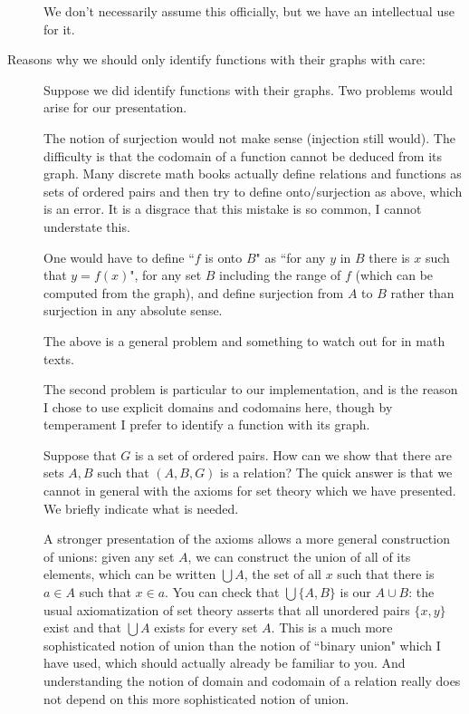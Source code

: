 \documentclass[12pt]{article}
\begin{document}
\begin{description}
\begin{description}
\end{description}

We don't necessarily assume this officially, but we have an intellectual use for it.

\item[Reasons why we should only identify functions with their graphs with care:]

Suppose we did identify functions with their graphs.  Two problems would arise for our presentation.

The notion of surjection would not make sense (injection still would).  The difficulty is that
the codomain of a function cannot be deduced from its graph.  Many discrete math books actually
define relations and functions as sets of ordered pairs and then try to define onto/surjection as above, which is an error.  It is a disgrace that this mistake is so common, I cannot understate this.

One would have to define ``$f$ is onto $B$" as ``for any $y$ in $B$ there is $x$ such that $y=f(x)$", for any set
$B$ including the range of $f$ (which can be computed from the graph), and define surjection from $A$ to $B$ rather than surjection in any absolute sense.

The above is a general problem and something to watch out for in math texts.

The second problem is particular to our implementation, and is the reason I chose to use explicit domains and codomains here, though by temperament I prefer to identify a function with its graph.

Suppose that $G$ is a set of ordered pairs.  How can we show that there are sets $A,B$ such that $(A,B,G)$ is a relation?
The quick answer is that we cannot in general with the axioms for set theory which we have presented.  We briefly indicate what is needed.

A stronger presentation of the axioms allows a more general construction of unions:  given any set $A$, we can construct the union of all of its elements, which can be written $\bigcup A$, the set of all $x$ such that there is $a \in A$ such
that $x \in a$.  You can check that $\bigcup \{A,B\}$ is our $A \cup B$:  the usual axiomatization of set theory 
asserts that all unordered pairs $\{x,y\}$ exist and that $\bigcup A$ exists for every set $A$.  This is a much more sophisticated notion of union than the notion of ``binary union" which I have used, which should actually already be familiar to you.  And understanding the notion of domain and codomain of a relation really does not depend on this more sophisticated notion of union.


\end{description}
\end{document}
